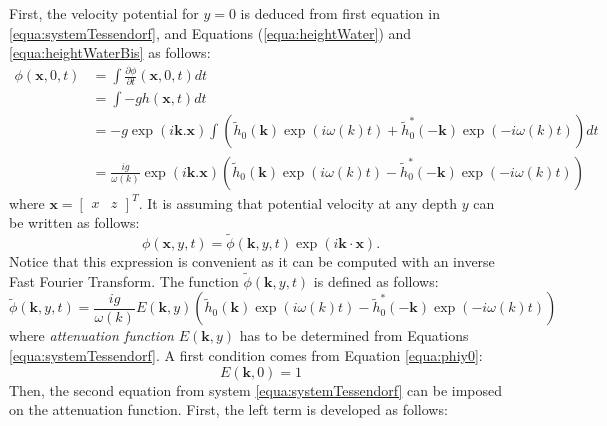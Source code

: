\documentclass[final]{jcgt}
\begin{document}
First, the velocity potential for $y=0$ is deduced from first equation in \ref{equa:systemTessendorf}, and Equations (\ref{equa:heightWater}) and \ref{equa:heightWaterBis} as follows:
\begin{align}
	\phi(\mathbf{x},0,t)
	 & = \int \frac{\partial \phi}{\partial t}(\mathbf{x},0,t)dt \nonumber                                                                                                             \\
	 & =\int-gh(\mathbf{x},t)dt \nonumber                                                                                                                                              \\
	 & = -g\exp(i\mathbf{k}.\mathbf{\mathbf{x}})\int\left(\tilde{h}_0(\mathbf{k})\exp(i\omega(k)t)+\tilde{h}_0^*(-\mathbf{k})\exp(-i\omega(k)t)\right)dt \nonumber                     \\
	 & = \frac{ig}{\omega(k)}\exp(i\mathbf{k}.\mathbf{\mathbf{x}})\left(\tilde{h}_0(\mathbf{k})\exp(i\omega(k)t)-\tilde{h}_0^*(-\mathbf{k})\exp(-i\omega(k)t)\right)\label{equa:phiy0}
\end{align}
where $\mathbf{x}=\left[\begin{array}{cc}x&z\end{array}\right]^T$.
It is assuming that potential velocity at any depth $y$ can be written as follows:
\begin{equation}
	\phi(\mathbf{x},y,t) = \tilde{\phi}(\mathbf{k}, y, t)\exp(i \mathbf{k}\cdot \mathbf{x}).
\end{equation}
Notice that this expression is convenient as it can be computed with an inverse Fast Fourier Transform.
The function $\tilde{\phi}(\mathbf{k}, y, t)$ is defined as follows:
\begin{equation}
	\tilde{\phi}(\mathbf{k}, y, t)=\frac{ig}{\omega(k)} E(\mathbf{k},y) \left(\tilde{h}_0(\mathbf{k})\exp(i\omega(k)t)-\tilde{h}_0^*(-\mathbf{k})\exp(-i\omega(k)t)\right)
\end{equation}
where \textit{attenuation function} $E(\mathbf{k},y)$ has to be determined from Equations \ref{equa:systemTessendorf}.
A first condition comes from Equation \ref{equa:phiy0}:
\begin{equation}
	E(\mathbf{k}, 0)=1 \label{equa:initialE}
\end{equation}
Then, the second equation from system \ref{equa:systemTessendorf} can be imposed on the attenuation function.
First, the left term is developed as follows:
\end{document}
